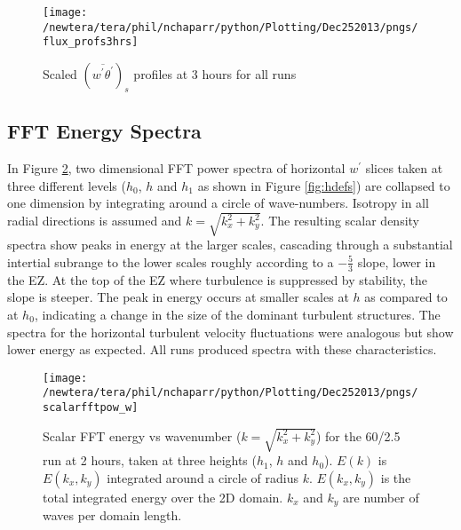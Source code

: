 \begin{figure}[htbp]
    \centering
    \texttt{[image: /newtera/tera/phil/nchaparr/python/Plotting/Dec252013/pngs/flux\_profs3hrs]}
    \caption{Scaled $(\overline{w^{'}\theta^{'}})_{s}$ profiles at 3 hours for all runs}
    \label{fig:fluxprofs2hrs}   %
\end{figure}

\clearpage

\subsection{FFT Energy Spectra}
\FloatBarrier

In Figure \ref{fig:scalarfftw602point5}, two dimensional \acs{FFT} power spectra of horizontal $w^{\prime}$ slices taken at three different levels ($h_{0}$, $h$ and $h_{1}$ as shown in Figure \ref{fig:hdefs}) are collapsed to one dimension by integrating around a circle of wave-numbers.
Isotropy in all radial directions is assumed and $k = \sqrt{k_{x}^{2} + k_{y}^{2}}$.  The resulting scalar density spectra show peaks in energy at the larger scales, cascading through a substantial intertial subrange to the lower scales roughly according to a $-\frac{5}{3}$ slope, lower in the \acs{EZ}.  At
the top of the \acs{EZ} where turbulence is suppressed by stability, the slope is steeper.  The peak in energy occurs at smaller scales
at $h$ as compared to at $h_{0}$, indicating a change in the size of the dominant turbulent structures. The spectra for the horizontal
turbulent velocity fluctuations were analogous but show lower energy as expected.  All runs produced spectra with these characteristics.\\

\begin{figure}[htbp]
    \centering
    \texttt{[image: /newtera/tera/phil/nchaparr/python/Plotting/Dec252013/pngs/scalarfftpow\_w]}
    \caption[\acs{FFT} energy spectra of turbulent Velocity]{Scalar FFT  energy vs wavenumber ($k = \sqrt{k_{x}^{2}+k_{y}^{2}}$) for the 60/2.5 run
at 2 hours, taken at three heights ($h_{1}$, $h$ and $h_{0}$).  $E(k)$ is $E(k_{x}, k_{y})$ integrated around a circle of radius $k$.  
   $E(k_{x}, k_{y})$ is the total integrated energy over the 2D domain.  
   $k_{x}$ and $k_{y}$ are number of waves per domain length.}
   \label{fig:scalarfftw602point5}   %
\end{figure}


